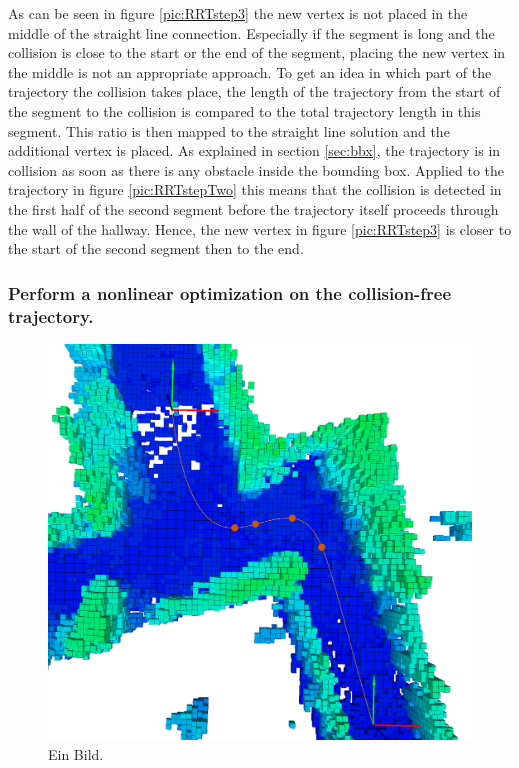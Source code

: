 As can be seen in figure \ref{pic:RRTstep3} the new vertex is not placed in the middle of the straight line connection. Especially if the segment is long and the collision is close to the start or the end of the segment, placing the new vertex in the middle is not an appropriate approach. To get an idea in which part of the trajectory the collision takes place, the length of the trajectory from the start of the segment to the collision is compared to the total trajectory length in this segment. This ratio is then mapped to the straight line solution and the additional vertex is placed. 
As explained in section \ref{sec:bbx}, the trajectory is in collision as soon as there is any obstacle inside the bounding box. Applied to the trajectory in figure \ref{pic:RRTstepTwo} this means that the collision is detected in the first half of the second segment before the trajectory itself proceeds through the wall of the hallway. Hence, the new vertex in figure \ref{pic:RRTstep3} is closer to the start of the second segment then to the end.






\subsubsection{Perform a nonlinear optimization on the collision-free trajectory.}


\begin{figure}[h]
   \centering
   \includegraphics[trim = 45mm 0mm 35mm 0mm, clip,width=1\textwidth]{pics/extensionCLongP.png}
   \caption{Ein Bild.}
\end{figure}




